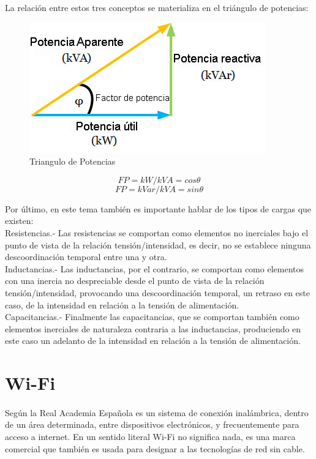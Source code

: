 La relación entre estos tres conceptos se materializa en el triángulo de potencias:

\begin{figure}[H]
	\centering
	\includegraphics[scale=.50]{Capitulo2/images/triangulo-potencias.jpg}
	\caption{Triangulo de Potencias}
	\label{fig:diagrama_dispensador}
\end{figure}

\[ FP = kW / kVA = cos\theta \]
\[ FP = kVar / kVA = sin\theta \]


Por último, en este tema también es importante hablar de los tipos de cargas que existen:
\\
Resistencias.- Las resistencias se comportan como elementos no inerciales bajo el punto de vista de la relación tensión/intensidad, es decir, no se establece ninguna descoordinación temporal entre una y otra.\\

Inductancias.- Las inductancias, por el contrario, se comportan como elementos con una inercia no despreciable desde el punto de vista de la relación tensión/intensidad, provocando una descoordinación temporal, un retraso en este caso, de la intensidad en relación a la tensión de alimentación.\\

Capacitancias.- Finalmente las capacitancias, que se comportan también como elementos inerciales de naturaleza contraria a las inductancias, produciendo en este caso un adelanto de la intensidad en relación a la tensión de alimentación.
 
 \section{Wi-Fi}
 \paragraph{}
 Según la Real Academia Española es un sistema de conexión inalámbrica, dentro de un área determinada, entre dispositivos electrónicos, y frecuentemente para acceso a internet. En un sentido literal Wi-Fi no significa nada, es una marca comercial que también es usada para designar a las tecnologías de red sin cable.
